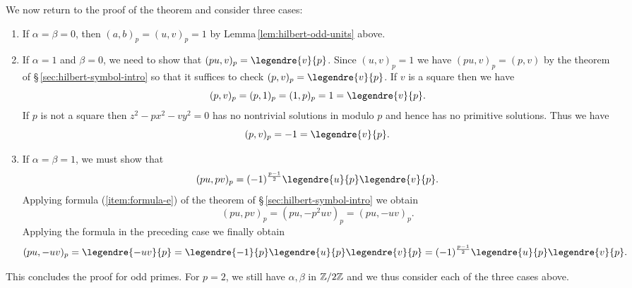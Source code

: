 \bigskip

We now return to the proof of the theorem and consider three cases:

\smallskip

\begin{enumerate}[nosep, label=(\roman*), wide]
    \item If \(\alpha = \beta = 0\), then \((a, b)_p = (u, v)_p = 1\) by Lemma\,\ref{lem:hilbert-odd-units} above.
    \item If \(\alpha = 1\) and \(\beta = 0\), we need to show that \((pu, v)_p ={ \legendre{v}{p}}\). Since \((u, v)_p = 1\) we have \((pu, v)_p = (p,v)\) by the theorem of \S\,\ref{sec:hilbert-symbol-intro} so that it suffices to check \((p, v)_p ={\legendre{v}{p}}\). If \(v\) is a square then we have
    \[
    (p, v)_p = (p, 1)_p = (1, p)_p = 1 = \legendre{v}{p}.
    \]
    If \(p\) is not a square then \(z^2 - px^2 - vy^2 = 0\) has no nontrivial solutions in modulo \(p\) and hence has no primitive solutions. Thus we have
    \[
    (p, v)_p = -1 = \legendre{v}{p}.
    \]
    \item If \(\alpha = \beta = 1\), we must show that
    \[
    (pu, pv)_p = (-1)^{\frac{p-1}{2}}\legendre{u}{p}\legendre{v}{p}.
    \]
    Applying formula (\ref{item:formula-e}) of the theorem of \S\,\ref{sec:hilbert-symbol-intro} we obtain
    \[
    (pu, pv)_p = (pu, -p^2uv)_p = (pu, -uv)_p.
    \]
    Applying the formula in the preceding case we finally obtain
    \[
    (pu, -uv)_p = \legendre{-uv}{p} =\legendre{-1}{p} \legendre{u}{p}\legendre{v}{p} = (-1)^{\frac{p-1}{2}}\legendre{u}{p}\legendre{v}{p}.
    \]
\end{enumerate}

This concludes the proof for odd primes. For \(p = 2\), we still have \(\alpha, \beta\) in \(\mathbb{Z}/2\mathbb{Z}\) and we thus consider each of the three cases above.

\smallskip

